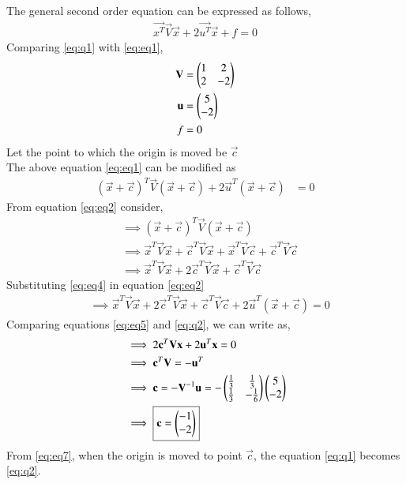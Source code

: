 \documentclass[journal,12pt,twocolumn]{IEEEtran}
\begin{document}
The general second order equation can be expressed as follows,
\begin{align}
\vec{x^T}\vec{V}\vec{x}+2\vec{u^T}\vec{x}+f=0\label{eq:eq1}
\end{align}
Comparing \eqref{eq:q1} with \eqref{eq:eq1},
\begin{align}
\mathbf{V} &= \begin{pmatrix}1 & 2\\2 & -2\end{pmatrix}\\
\mathbf{u} &= \begin{pmatrix}5\\ -2\end{pmatrix}\\
f &= 0
\end{align}
Let the point to which the origin is moved be $\vec{c}$\\
The above equation \eqref{eq:eq1} can be modified as
\begin{align}
(\vec{x}+\vec{c})^T\vec{V}(\vec{x}+\vec{c})+2\vec{u}^T(\vec{x}+\vec{c})&=0\label{eq:eq2}
\end{align}
From equation \eqref{eq:eq2} consider,
\begin{align}
    &\implies(\vec{x}+\vec{c})^T\vec{V}(\vec{x}+\vec{c})\\
    &\implies\vec{x}^T\vec{V}\vec{x}+\vec{c}^T\vec{V}\vec{x}+\vec{x}^T\vec{V}\vec{c}+\vec{c}^T\vec{V}\vec{c}\label{eq:eq3}\\
    &\implies\vec{x}^T\vec{V}\vec{x}+2\vec{c}^T\vec{V}\vec{x}+\vec{c}^T\vec{V}\vec{c}\label{eq:eq4}
\end{align}
Substituting \eqref{eq:eq4} in equation \eqref{eq:eq2}
\begin{align}
    &\implies\vec{x}^T\vec{V}\vec{x}+2\vec{c}^T\vec{V}\vec{x}+\vec{c}^T\vec{V}\vec{c}+2\vec{u}^T(\vec{x}+\vec{c})=0 \label{eq:eq5}
\end{align}
Comparing equations \eqref{eq:eq5} and \eqref{eq:q2}, we can write as,
\begin{align}
    &\implies 2\mathbf{c}^T\mathbf{V}\mathbf{x}+2\mathbf{u}^T\mathbf{x}=0\\
    &\implies \mathbf{c}^T\mathbf{V}= -\mathbf{u}^T\\
    &\implies \mathbf{c}= -\mathbf{V}^{-1}\mathbf{u}= -\begin{pmatrix}\frac{1}{3}&\frac{1}{3}\\ \frac{1}{3}&-\frac{1}{6}\end{pmatrix}\begin{pmatrix}5\\-2\end{pmatrix} \label{eq:eq6}\\
    &\implies \boxed{\mathbf{c}= \begin{pmatrix}-1\\-2\end{pmatrix}} \label{eq:eq7}
\end{align}
From \eqref{eq:eq7}, when the origin is moved to point $\vec{c}$, the equation \eqref{eq:q1} becomes \eqref{eq:q2}.\\
\end{document}

